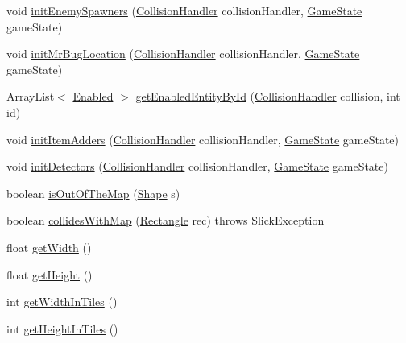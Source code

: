 \begin{DoxyCompactItemize}
\item 
void \mbox{\hyperlink{classentities_1_1_map_a475dade0cc451ced58633690801baec5}{init\+Enemy\+Spawners}} (\mbox{\hyperlink{classentities_1_1_collision_handler}{Collision\+Handler}} collision\+Handler, \mbox{\hyperlink{classstates_1_1_game_state}{Game\+State}} game\+State)
\item 
void \mbox{\hyperlink{classentities_1_1_map_a8678aecbe6308ad69b2596d3452974cf}{init\+Mr\+Bug\+Location}} (\mbox{\hyperlink{classentities_1_1_collision_handler}{Collision\+Handler}} collision\+Handler, \mbox{\hyperlink{classstates_1_1_game_state}{Game\+State}} game\+State)
\item 
Array\+List$<$ \mbox{\hyperlink{interfaceentities_1_1_enabled}{Enabled}} $>$ \mbox{\hyperlink{classentities_1_1_map_afc132389c586910ffe04d24a96ae5d19}{get\+Enabled\+Entity\+By\+Id}} (\mbox{\hyperlink{classentities_1_1_collision_handler}{Collision\+Handler}} collision, int id)
\item 
void \mbox{\hyperlink{classentities_1_1_map_aab876045f8037049288a1683cb0c250b}{init\+Item\+Adders}} (\mbox{\hyperlink{classentities_1_1_collision_handler}{Collision\+Handler}} collision\+Handler, \mbox{\hyperlink{classstates_1_1_game_state}{Game\+State}} game\+State)
\item 
void \mbox{\hyperlink{classentities_1_1_map_a501c11a9a6f076a7a2e8c8880eeceae6}{init\+Detectors}} (\mbox{\hyperlink{classentities_1_1_collision_handler}{Collision\+Handler}} collision\+Handler, \mbox{\hyperlink{classstates_1_1_game_state}{Game\+State}} game\+State)
\item 
boolean \mbox{\hyperlink{classentities_1_1_map_ac0f565ccdac5df088ea9424a6c218b14}{is\+Out\+Of\+The\+Map}} (\mbox{\hyperlink{classorg_1_1newdawn_1_1slick_1_1geom_1_1_shape}{Shape}} s)
\item 
boolean \mbox{\hyperlink{classentities_1_1_map_a0dadc6784b338c8aa26adb95568e75fb}{collides\+With\+Map}} (\mbox{\hyperlink{classorg_1_1newdawn_1_1slick_1_1geom_1_1_rectangle}{Rectangle}} rec)  throws Slick\+Exception 
\item 
float \mbox{\hyperlink{classentities_1_1_map_a7c15a6b2fac91bdb2592e1db1bc78623}{get\+Width}} ()
\item 
float \mbox{\hyperlink{classentities_1_1_map_a9ed9d1f8683c86dfca33639e252aaded}{get\+Height}} ()
\item 
int \mbox{\hyperlink{classentities_1_1_map_a7caa160e4dd0164e861ad238cc58ac36}{get\+Width\+In\+Tiles}} ()
\item 
int \mbox{\hyperlink{classentities_1_1_map_ae174e8e21c6307ea9058905778480ec1}{get\+Height\+In\+Tiles}} ()

\end{DoxyCompactItemize}
